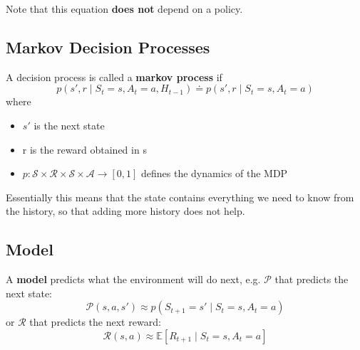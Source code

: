 Note that this equation \textbf{does not} depend on a policy.


\subsection{Markov Decision Processes}

\begin{definition}
    A decision process is called a \textbf{markov process} if
    \[
        p(s', r \mid S_t = s, A_t = a, H_{t-1}) \doteq p(s', r \mid S_t = s, A_t = a)
    \]
    where
    \begin{itemize}
        \item $s'$ is the next state
        \item r is the reward obtained in s
        \item $p: \mathcal{S} \times \mathcal{R} \times \mathcal{S} \times \mathcal{A} \to [0, 1]$ defines the dynamics of the MDP
    \end{itemize}
\end{definition}

Essentially this means that the state contains everything we need to know from the history, so that adding more history does not help.

\subsection{Model}\label{sec:model}
A \textbf{model} predicts what the environment will do next, e.g. $\mathcal{P}$ that predicts the next state:
\[
    \mathcal{P}(s,a,s') \approx p(S_{t+1}=s' \mid S_t = s, A_t = a)
\]
or $\mathcal{R}$ that predicts the next reward:
\[
    \mathcal{R}(s,a) \approx \mathbb{E}[R_{t+1} \mid S_t=s, A_t=a]
\]